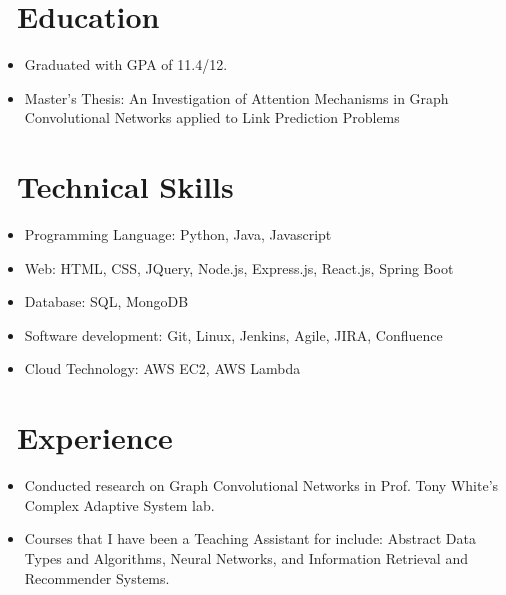 \documentclass{resume}
\begin{document}



\section{\faGraduationCap\ Education}
\begin{itemize}
	\item Graduated with GPA of 11.4/12.
	\item Master's Thesis: An Investigation of Attention Mechanisms in Graph Convolutional Networks applied to Link Prediction Problems
\end{itemize}
 


\section{\faCogs\ Technical Skills}
\begin{itemize}
	\item Programming Language: Python, Java, Javascript
	\item Web: HTML, CSS, JQuery, Node.js, Express.js, React.js, Spring Boot
	\item Database: SQL, MongoDB
	\item Software development: Git, Linux, Jenkins, Agile, JIRA, Confluence
	\item Cloud Technology: AWS EC2, AWS Lambda
\end{itemize}

\section{\faCogs\ Experience}
\begin{itemize}
	\item Conducted research on Graph Convolutional Networks in Prof. Tony White's Complex Adaptive System lab.
	\item Courses that I have been a Teaching Assistant for include: Abstract Data Types and Algorithms, Neural Networks, and Information Retrieval and Recommender Systems.
\end{itemize}
\end{document}
